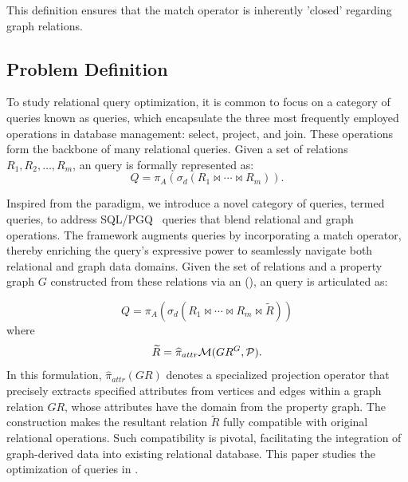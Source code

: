 This definition ensures that the match operator is inherently 'closed' regarding graph relations.


\subsection{Problem Definition}
\label{sec:problem-definition}

To study relational query optimization, it is common to focus on a category of queries known as \spj queries,
which encapsulate the three most frequently employed operations in database management: select, project, and join.
These operations form the backbone of many relational queries. Given a set of relations \(R_1, R_2, \ldots, R_m\),
an \spj query is formally represented as:
\[
Q = \pi_A(\sigma_d(R_1 \Join \cdots \Join R_m)).
\]

Inspired from the \spj paradigm, we introduce a novel category of queries, termed \spjm queries, to address SQL/PGQ~\cite{sql-pgq} queries that
blend relational and graph operations. The \spjm framework augments \spj queries by incorporating a match operator, thereby enriching the query's expressive power to seamlessly navigate both relational and graph data domains.
Given the set of relations and a property graph \(G\) constructed from these relations via an \rgmapping (),
an \spjm query is articulated as:

\begin{equation}
    \label{eq:spjm}
Q = \pi_A(\sigma_d(R_1 \Join \cdots \Join R_m \Join \widetilde{R}))
\end{equation}
where
\[
\widetilde{R} = \widehat{\pi}_{attr}\mathcal{M}(GR^G, \mathcal{P}).
\]
In this formulation, \(\widehat{\pi}_{attr}(GR)\) denotes a specialized projection operator that precisely extracts specified attributes
from vertices and edges within a graph relation $GR$, whose attributes have the domain from the property graph.
The construction makes the resultant relation \(\tilde{R}\) fully compatible with original relational operations.
Such compatibility is pivotal, facilitating the integration of graph-derived data into existing relational database.
This paper studies the optimization of \spjm queries in .



